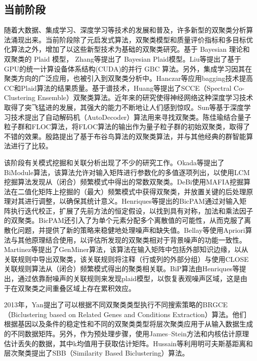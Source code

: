     \subsection{当前阶段}
    随着大数据、集成学习、深度学习等技术的发展和普及，许多新型的双聚类分析算法涌现出来。当前阶段除了元启发式算法，双聚类模型和质量评价指标和多目标优化算法之外，增加了以这些新型技术为基础的双聚类研究。基于 Bayesian 理论和双聚类的 Plaid 模型， Zhang\cite{zhang2010bayesian}等提出了 Bayesian Plaid模型。Liu\cite{liu2014gpu}等提出了基于GPU的统一计算设备体系结构(CUDA)的并行 GBC 算法。另外，集成学习因其在聚类方向的广泛应用，也被引入到双聚类分析中。Hanczar\cite{hanczar2010bagging}等应用bagging技术提高CC和Plaid算法的结果质量。基于谱技术，Huang\cite{huang2015spectral}等提出了SCCE（Spectral Co-Clustering Ensemble）双聚类算法。近年来的研究使得神经网络这种深度学习技术取得了突飞猛进的发展，其强大的能力不断地让人们感到惊叹。Sun\cite{sun2013noise}等基于深度学习技术提出了自动解码机（AutoDecoder）算法用来寻找双聚类。陈佳瑜\cite{chenjiayu}结合量子粒子群和FLOC算法，将FLOC算法的输出作为量子粒子群的初始双聚类，取得了不错的效果。殷路\cite{yinlu}提出了基于布谷鸟算法的双聚类算法，并与其他经典的群智能算法进行了比较。

    该阶段有关模式挖掘和关联分析出现了不少的研究工作。Okada\cite{okada2007biclustering}等提出了BiModule算法，该算法允许对输入矩阵进行参数化的多值逐项列出，以使用LCM挖掘算法发现从（闭合）频繁模式中得出的常数双聚类。DeBi\cite{debi}使用MAFIA挖掘算法在二值化矩阵上挖掘的（最大）频繁模式中获得双聚类，并放置关键的后处理原理对其进行调整，以确保其统计意义。Henriques\cite{henriques2014bicpam}等提出的BicPAM通过对输入矩阵执行迭代校正，扩展了先前方法的恒定假设，以找到具有对称，加法和乘法因子的双聚类。BicPAM还引入了为单个元素分配多个离散值的可能性，从而克服了离散化问题，并提供了新的策略来稳健地处理噪声和缺失值。Bellay\cite{bellay2011putting}等使用Apriori算法与其他原理结合使用，以评估所发现的双聚类相对于背景噪声的功能一致性。 Martinez\cite{martinez2007genminer}等提出了GenMiner算法，该算法在输入矩阵中包括外部知识边缘，以从关联规则中导出双聚类，该关联规则将注释（行或列的外部分组）与使用CLOSE关联规则算法从（闭合）频繁模式得出的聚类相关联。BiP算法由Henriques\cite{henriques2015biclustering}等提出，通过依靠耐噪声的关联规则来发现plaid模型，以恢复表观噪声区域，这是由于在双聚类之间重叠区域上存在累积效应。

    2013年，Yan\cite{yan2013biclustering}提出了可以根据不同双聚类类型执行不同搜索策略的BRGCE（Biclustering based on Related Genes and Conditions Extraction）算法。他们根据基因以及条件的稳定性和不同的双聚类类型将层次聚类应用于从输入数据生成的不同数据矩阵。另外，作为预处理步骤，使用James–Stein方法和内核估计原理估计丢失的数据，其中k均值用于获取估计矩阵。Hussain\cite{hussain2016biclustering}等利用明可夫斯基距离和层次聚类提出了SBB（Similarity Based Biclustering）算法。

